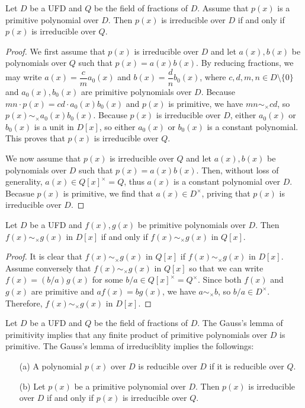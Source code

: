 \begin{thm}
    Let $D$ be a UFD and $Q$ be the field of fractions of $D$.
    Assume that $p(x)$ is a primitive polynomial over $D$.
    Then $p(x)$ is irreducible over $D$ if and only if $p(x)$ is irreducible over $Q$.
\end{thm}
\begin{proof}
    We first assume that $p(x)$ is irreducible over $D$ and let $a(x), b(x)$ be polynomials over $Q$ such that $p(x)=a(x)b(x)$.
    By reducing fractions, we may write $a(x)=\dfrac{c}{m}a_0(x)$ and $b(x)=\dfrac{d}{n}b_0(x)$, where $c, d, m, n\in D\setminus\{0\}$ and $a_0(x), b_0(x)$ are primitive polynomials over $D$.
    Because $mn\cdot p(x)=cd\cdot a_0(x)b_0(x)$ and $p(x)$ is primitive, we have $mn\sim_\times cd$, so $p(x)\sim_\times a_0(x)b_0(x)$.
    Because $p(x)$ is irreducible over $D$, either $a_0(x)$ or $b_0(x)$ is a unit in $D[x]$, so either $a_0(x)$ or $b_0(x)$ is a constant polynomial.
    This proves that $p(x)$ is irreducible over $Q$.

    We now assume that $p(x)$ is irreducible over $Q$ and let $a(x), b(x)$ be polynomials over $D$ such that $p(x)=a(x)b(x)$.
    Then, without loss of generality, $a(x)\in Q[x]^\times=Q$, thus $a(x)$ is a constant polynomial over $D$.
    Becasue $p(x)$ is primitive, we find that $a(x)\in D^\times$, priving that $p(x)$ is irreducible over $D$.
\end{proof}

\begin{cor}
    Let $D$ be a UFD and $f(x), g(x)$ be primitive polynomials over $D$.
    Then $f(x)\sim_\times g(x)$ in $D[x]$ if and only if $f(x)\sim_\times g(x)$ in $Q[x]$.
\end{cor}
\begin{proof}
    It is clear that $f(x)\sim_\times g(x)$ in $Q[x]$ if $f(x)\sim_\times g(x)$ in $D[x]$.
    Assume conversely that $f(x)\sim_\times g(x)$ in $Q[x]$ so that we can write $f(x)=(b/a)g(x)$ for some $b/a\in Q[x]^\times=Q^\times$.
    Since both $f(x)$ and $g(x)$ are primitive and $af(x)=bg(x)$, we have $a\sim_\times b$, so $b/a\in D^\times$.
    Therefore, $f(x)\sim_\times g(x)$ in $D[x]$.
\end{proof}

\begin{rmk}
    Let $D$ be a UFD and $Q$ be the field of fractions of $D$.
    The Gauss's lemma of primitivity implies that any finite product of primitive polynomials over $D$ is primitive.
    The Gauss's lemma of irreduciblity implies the followings:
    \begin{enumerate}
        \item[(a)]
        {
            A polynomial $p(x)$ over $D$ is reducible over $D$ if it is reducible over $Q$.
        }
        \item[(b)]
        {
            Let $p(x)$ be a primitive polynomial over $D$.
            Then $p(x)$ is irreducible over $D$ if and only if $p(x)$ is irreducible over $Q$.
        }
    \end{enumerate}
\end{rmk}

